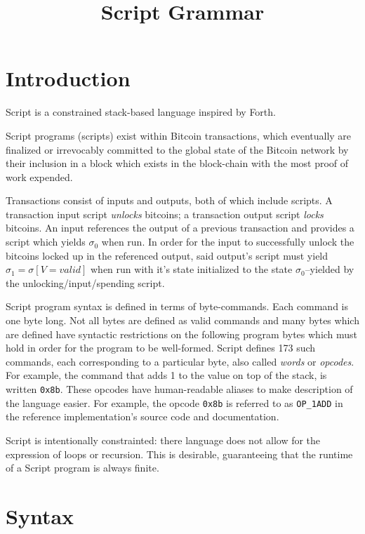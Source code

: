 \documentclass{article}
\begin{document}

\title{Script Grammar}
\date{}
\maketitle


\section{Introduction}

Script is a constrained stack-based language inspired by Forth.

Script programs (scripts) exist within Bitcoin transactions, which eventually are finalized or irrevocably committed to the global state of the Bitcoin network by their inclusion in a block which exists in the block-chain with the most proof of work expended.

Transactions consist of inputs and outputs, both of which include scripts. A transaction input script \textit{unlocks} bitcoins; a transaction output script \textit{locks} bitcoins. An input references the output of a previous transaction and provides a script which yields $\sigma_0$ when run. In order for the input to successfully unlock the bitcoins locked up in the referenced output, said output's script must yield $\sigma_1 = \sigma[V = valid]$ when run with it's state initialized to the state $\sigma_0$--yielded by the unlocking/input/spending script.


Script program syntax is defined in terms of byte-commands. Each command is one byte long. Not all bytes are defined as valid commands and many bytes which are defined have syntactic restrictions on the following program bytes which must hold in order for the program to be well-formed. Script defines 173 such commands, each corresponding to a particular byte, also called \textit{words} or \textit{opcodes}. For example, the command that adds 1 to the value on top of the stack, is written \texttt{0x8b}. These opcodes have human-readable aliases to make description of the language easier. For example, the opcode \texttt{0x8b} is referred to as \texttt{OP\_1ADD} in the reference implementation's source code and documentation.

Script is intentionally constrainted: there language does not allow for the expression of loops or recursion. This is desirable, guaranteeing that the runtime of a Script program is always finite.


\hypertarget{SYNTAX}{\section{Syntax}}
\end{document}
